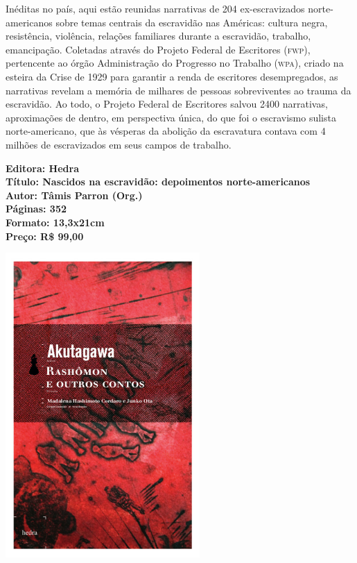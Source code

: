 \hspace*{-7cm}\hrulefill\hspace*{-7cm}

\medskip

\noindent{}Inéditas no país, aqui estão reunidas narrativas de 204 ex-escravizados norte-americanos sobre temas centrais da escravidão nas Américas: cultura negra, resistência, violência, relações familiares durante a escravidão, trabalho, emancipação.
Coletadas através do Projeto Federal de Escritores (\textsc{fwp}), pertencente ao órgão Administração do Progresso no Trabalho (\textsc{wpa}), criado na esteira da Crise de 1929 para garantir a renda de escritores desempregados, as narrativas revelam a memória de milhares de pessoas sobreviventes ao trauma da escravidão. Ao todo, o Projeto Federal de Escritores salvou 2400 narrativas, aproximações de dentro, em perspectiva única, do que foi o escravismo sulista norte-americano, que às vésperas da abolição da escravatura contava com 4 milhões de escravizados em seus campos de trabalho.

\vfill

\noindent\begin{minipage}[c]{1\linewidth}
{\small\textbf{
\hspace*{-.1cm}Editora: Hedra\\
Título: Nascidos na escravidão: depoimentos norte-americanos\\
Autor: Tâmis Parron (Org.)\\ 
Páginas: 352\\
Formato: 13,3x21cm\\
Preço: R\$ 99,00\\
}}
\end{minipage}

\pagebreak


\begin{center}
\hspace*{-3.6cm}
\hspace*{3.1cm}\includegraphics[width=74mm]{./grid/rashomon.jpeg}
\end{center}

